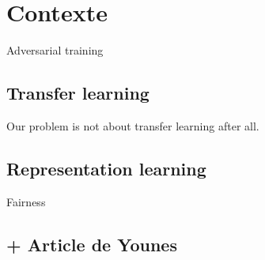 
\chapter{Contexte}
\label{chap:contexte}
\ifpdf
    \graphicspath{{Chapter3/Figs/Raster/}{Chapter3/Figs/PDF/}{Chapter3/Figs/}}
\else
    \graphicspath{{Chapter3/Figs/Vector/}{Chapter3/Figs/}}
\fi


Adversarial training

\section{Transfer learning}


Our problem is not about transfer learning after all.

\section{Representation learning}

Fairness


\section{+ Article de Younes}



